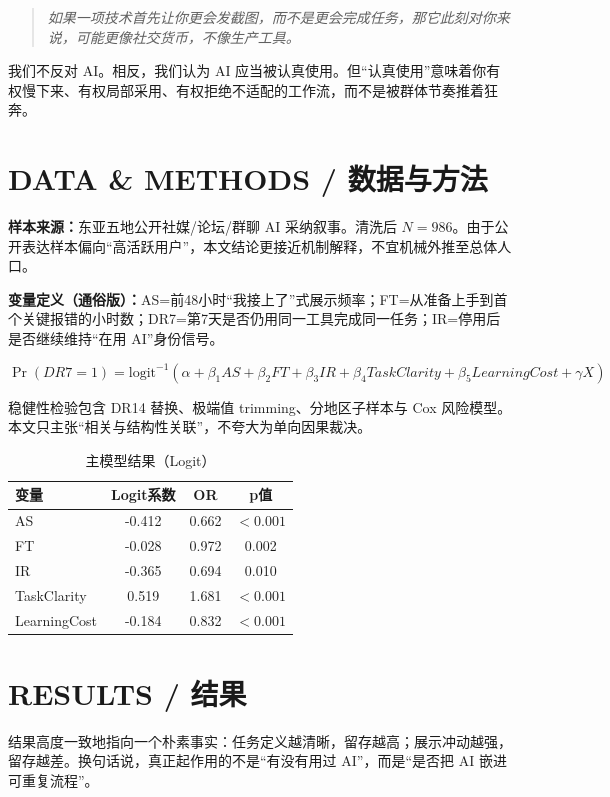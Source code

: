 \documentclass[11pt,a4paper]{ctexart}
\begin{document}
\begin{quote}
\textit{如果一项技术首先让你更会发截图，而不是更会完成任务，那它此刻对你来说，可能更像社交货币，不像生产工具。}
\end{quote}

我们不反对 AI。相反，我们认为 AI 应当被认真使用。但“认真使用”意味着你有权慢下来、有权局部采用、有权拒绝不适配的工作流，而不是被群体节奏推着狂奔。

\twocolumn

\section{DATA \& METHODS / 数据与方法}
\textbf{样本来源：}东亚五地公开社媒/论坛/群聊 AI 采纳叙事。清洗后 $N=986$。由于公开表达样本偏向“高活跃用户”，本文结论更接近机制解释，不宜机械外推至总体人口。

\textbf{变量定义（通俗版）：}AS=前48小时“我接上了”式展示频率；FT=从准备上手到首个关键报错的小时数；DR7=第7天是否仍用同一工具完成同一任务；IR=停用后是否继续维持“在用 AI”身份信号。

\begin{equation}
\Pr(DR7=1)=\text{logit}^{-1}(\alpha+\beta_1 AS+\beta_2 FT+\beta_3 IR+\beta_4 TaskClarity+\beta_5 LearningCost+\gamma X)
\end{equation}

稳健性检验包含 DR14 替换、极端值 trimming、分地区子样本与 Cox 风险模型。本文只主张“相关与结构性关联”，不夸大为单向因果裁决。

\begin{table}[h]
\centering
\caption{主模型结果（Logit）}
\begin{tabular}{>{\raggedright}p{2.2cm}ccc}
\toprule
变量 & Logit系数 & OR & p值 \\
\midrule
AS & -0.412 & 0.662 & $<0.001$ \\
FT & -0.028 & 0.972 & 0.002 \\
IR & -0.365 & 0.694 & 0.010 \\
TaskClarity & 0.519 & 1.681 & $<0.001$ \\
LearningCost & -0.184 & 0.832 & $<0.001$ \\
\bottomrule
\end{tabular}
\end{table}

\section{RESULTS / 结果}
结果高度一致地指向一个朴素事实：任务定义越清晰，留存越高；展示冲动越强，留存越差。换句话说，真正起作用的不是“有没有用过 AI”，而是“是否把 AI 嵌进可重复流程”。
\end{document}
